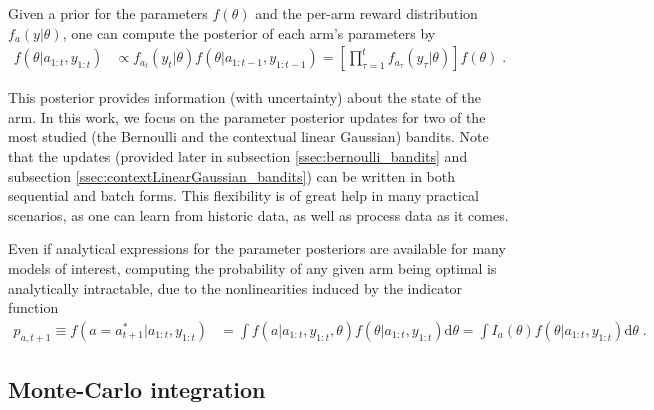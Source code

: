\documentclass{article}
\begin{document}
Given a prior for the parameters $f(\theta)$ and the per-arm reward distribution $f_{a}(y|\theta)$, one can compute the posterior of each arm's parameters by
\begin{equation}
\begin{split}
f(\theta|a_{1:t}, y_{1:t}) &\propto f_{a_t}(y_t | \theta)f(\theta | a_{1:t-1}, y_{1:t-1}) = \left[\prod_{\tau=1}^t f_{a_{\tau}}(y_{\tau}|\theta)\right] f(\theta) \; .
\end{split}
\label{eq:seq_param_posterior}
\end{equation}

This posterior provides information (with uncertainty) about the state of the arm. In this work, we focus on the parameter posterior updates for two of the most studied (the Bernoulli and the contextual linear Gaussian) bandits. Note that the updates (provided later in subsection \ref{ssec:bernoulli_bandits} and subsection \ref{ssec:contextLinearGaussian_bandits}) can be written in both sequential and batch forms. This flexibility is of great help in many practical scenarios, as one can learn from historic data, as well as process data as it comes.

Even if analytical expressions for the parameter posteriors are available for many models of interest, computing the probability of any given arm being optimal is analytically intractable, due to the nonlinearities induced by the indicator function
\begin{equation}
\begin{split}
p_{a,t+1} \equiv f(a=a^*_{t+1}|a_{1:t}, y_{1:t})&=\int f(a|a_{1:t}, y_{1:t}, \theta) f(\theta|a_{1:t}, y_{1:t}) \mathrm{d}\theta = \int I_a(\theta) f(\theta|a_{1:t}, y_{1:t}) \mathrm{d}\theta \; .
\label{eq:pr_arm_optimal_bayes_indicator}
\end{split}
\end{equation}

\subsection{Monte-Carlo integration}
\label{ssec:mc_integration}
\end{document}
